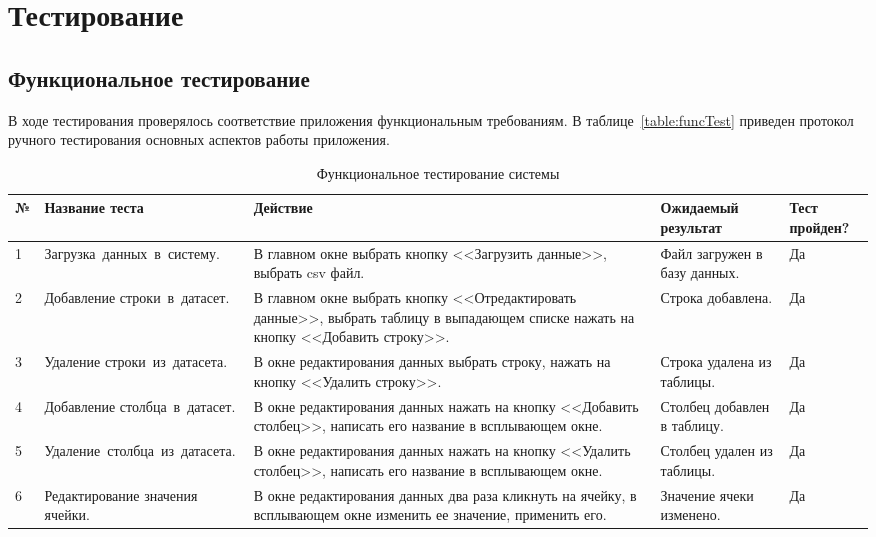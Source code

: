 \newpage
\section{Тестирование}
\label{sec:Experiments}
\subsection{Функциональное тестирование}
\label{subsec:Algoritm}
В ходе тестирования проверялось соответствие приложения функциональным требованиям. В таблице~\ref{table:funcTest} приведен протокол ручного тестирования основных аспектов работы приложения.

\begin{table}[H]
    \caption{Функциональное тестирование системы}
    \vspace{1em}
    \small
    \begin{tabular}{|l|p{3cm}|p{5.7cm}|p{2.3cm}|p{2.3cm}|}
    \hline
    \multicolumn{1}{|c|}{\textbf{№}} &
      \multicolumn{1}{p{3cm}|}{\centering \textbf{Название теста}} &
      \multicolumn{1}{p{5.7cm}|}{\centering \textbf{Действие}} &
      \multicolumn{1}{p{2.3cm}|}{\centering \textbf{Ожидаемый результат}} &
      \multicolumn{1}{p{2.3cm}|}{\centering \textbf{Тест пройден?}} \\ \hline
    1  & Загрузка~данных~в~систему. & В главном окне выбрать кнопку <<Загрузить данные>>, выбрать csv файл. & Файл загружен в базу данных. & Да \\ \hline
    2  & Добавление строки~в~датасет. & В главном окне выбрать кнопку <<Отредактировать данные>>, выбрать таблицу в выпадающем списке нажать на кнопку <<Добавить строку>>. & Строка добавлена. & Да \\ \hline
    3  & Удаление строки~из~датасета. & В окне редактирования данных выбрать строку, нажать на кнопку <<Удалить строку>>. & Строка удалена из таблицы. & Да \\ \hline
    4  & Добавление столбца~в~датасет. & В окне редактирования данных нажать на кнопку <<Добавить столбец>>, написать его название в всплывающем окне. & Столбец добавлен в таблицу. & Да \\ \hline
    5  & Удаление~столбца~из~датасета. & В окне редактирования данных нажать на кнопку <<Удалить столбец>>, написать его название в всплывающем окне. & Столбец удален из таблицы. & Да \\ \hline
    6  & Редактирование значения ячейки. & В окне редактирования данных два раза кликнуть на ячейку, в всплывающем окне изменить ее значение, применить его. & Значение ячеки изменено. & Да \\ \hline

\end{tabular}
\end{table}
